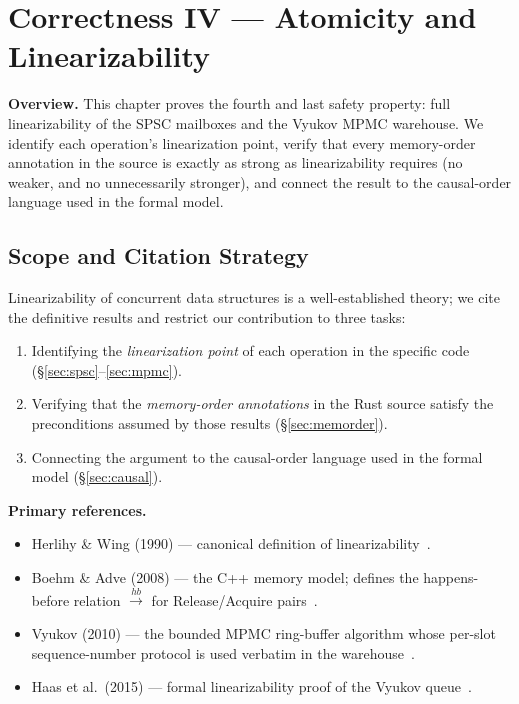 \documentclass[11pt,a4paper]{report}
\begin{document}

\chapter{Correctness IV --- Atomicity and Linearizability}
\label{chap:linearizability}

\bigskip
\noindent\textbf{Overview.}
This chapter proves the fourth and last safety property: full
linearizability of the SPSC mailboxes and the Vyukov MPMC warehouse.
We identify each operation's linearization point, verify that every
memory-order annotation in the source is exactly as strong as
linearizability requires (no weaker, and no unnecessarily stronger),
and connect the result to the causal-order language used in the
formal model.


\section{Scope and Citation Strategy}

Linearizability of concurrent data structures is a well-established
theory; we cite the definitive results and restrict our contribution
to three tasks:
\begin{enumerate}
  \item Identifying the \emph{linearization point} of each operation
        in the specific code (\S\ref{sec:spsc}--\ref{sec:mpmc}).
  \item Verifying that the \emph{memory-order annotations} in the
        Rust source satisfy the preconditions assumed by those results
        (\S\ref{sec:memorder}).
  \item Connecting the argument to the causal-order language used in
        the formal model (\S\ref{sec:causal}).
\end{enumerate}

\medskip\noindent\textbf{Primary references.}
\begin{itemize}
  \item Herlihy \& Wing (1990) --- canonical definition of
        linearizability~\cite{herlihy_wing1990}.
  \item Boehm \& Adve (2008) --- the C++ memory model; defines the
        happens-before relation $\xrightarrow{hb}$ for
        Release/Acquire pairs~\cite{boehm2008}.
  \item Vyukov (2010) --- the bounded MPMC ring-buffer algorithm whose
        per-slot sequence-number protocol is used verbatim in the
        warehouse~\cite{vyukov2010}.
  \item Haas et al.\ (2015) --- formal linearizability proof of the
        Vyukov queue~\cite{haas2015}.
\end{itemize}
\end{document}

